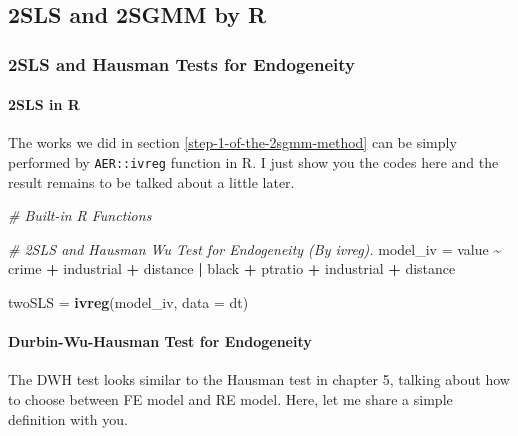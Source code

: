 \documentclass[
  12pt,
]{article}
\newenvironment{Shaded}{\begin{snugshade}}{\end{snugshade}}
\newcommand{\CommentTok}[1]{\textcolor[rgb]{0.56,0.35,0.01}{\textit{#1}}}
\newcommand{\DataTypeTok}[1]{\textcolor[rgb]{0.13,0.29,0.53}{#1}}
\newcommand{\KeywordTok}[1]{\textcolor[rgb]{0.13,0.29,0.53}{\textbf{#1}}}
\newcommand{\NormalTok}[1]{#1}
\newcommand{\OperatorTok}[1]{\textcolor[rgb]{0.81,0.36,0.00}{\textbf{#1}}}
\newcommand{\StringTok}[1]{\textcolor[rgb]{0.31,0.60,0.02}{#1}}
\begin{document}
\newpage

\hypertarget{sls-and-2sgmm-by-r}{%
\subsection{2SLS and 2SGMM by R}\label{sls-and-2sgmm-by-r}}

\hypertarget{sls-and-hausman-tests-for-endogeneity}{%
\subsubsection{2SLS and Hausman Tests for Endogeneity}\label{sls-and-hausman-tests-for-endogeneity}}

\hypertarget{sls-in-r}{%
\paragraph{2SLS in R}\label{sls-in-r}}

The works we did in section \ref{step-1-of-the-2sgmm-method} can be simply performed by \texttt{AER::ivreg} function in R. I just show you the codes here and the result remains to be talked about a little later.

\begin{Shaded}
\begin{Highlighting}[]
\CommentTok{\# Built{-}in R Functions}

\CommentTok{\# 2SLS and Hausman Wu Test for Endogeneity (By ivreg).}
\NormalTok{model\_iv =}\StringTok{ }\NormalTok{value }\OperatorTok{\textasciitilde{}}\StringTok{ }\NormalTok{crime }\OperatorTok{+}\StringTok{ }\NormalTok{industrial }\OperatorTok{+}\StringTok{ }\NormalTok{distance }\OperatorTok{|}\StringTok{ }
\StringTok{    }\NormalTok{black }\OperatorTok{+}\StringTok{ }\NormalTok{ptratio }\OperatorTok{+}\StringTok{ }\NormalTok{industrial }\OperatorTok{+}\StringTok{ }\NormalTok{distance}

\NormalTok{twoSLS =}\StringTok{ }\KeywordTok{ivreg}\NormalTok{(model\_iv, }\DataTypeTok{data =}\NormalTok{ dt)}
\end{Highlighting}
\end{Shaded}

\hypertarget{durbin-wu-hausman-test-for-endogeneity}{%
\paragraph{Durbin-Wu-Hausman Test for Endogeneity}\label{durbin-wu-hausman-test-for-endogeneity}}

The DWH test looks similar to the Hausman test in chapter 5, talking about how to choose between FE model and RE model. Here, let me share a simple definition with you.
\end{document}
